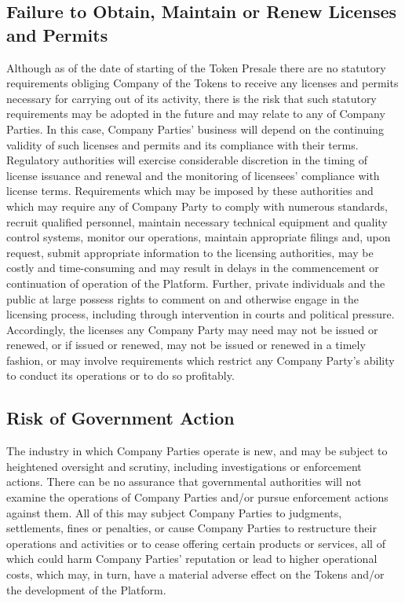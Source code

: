 \documentclass[12pt]{report}
\begin{document}
\subsection*{Failure to Obtain, Maintain or Renew Licenses and Permits}
Although as of the date of starting of the Token Presale there are no statutory requirements obliging Company of the Tokens to receive any licenses and permits necessary for carrying out of its activity, there is the risk that such statutory requirements may be adopted in the future and may relate to any of Company Parties. In this case, Company Parties’ business will depend on the continuing validity of such licenses and permits and its compliance with their terms. Regulatory authorities will exercise considerable discretion in the timing of license issuance and
renewal and the monitoring of licensees’ compliance with license terms. Requirements which may be imposed by these authorities and which may require any of Company Party to comply with numerous standards, recruit qualified personnel, maintain necessary technical equipment and quality control systems, monitor our operations, maintain appropriate filings and, upon request, submit appropriate information to the licensing authorities, may be costly and time-consuming and may result in delays in the commencement or continuation of operation of the
Platform. Further, private individuals and the public at large possess rights to comment on and otherwise engage in the licensing process, including through intervention in courts and political pressure. Accordingly, the licenses any
Company Party may need may not be issued or renewed, or if issued or renewed, may not be issued or renewed in a timely fashion, or may involve requirements which restrict any Company Party’s ability to conduct its operations or to do so profitably.

\subsection*{Risk of Government Action}
The industry in which Company Parties operate is new, and may be subject to heightened oversight and scrutiny, including investigations or enforcement actions. There can be no assurance that governmental authorities will not examine the operations of Company Parties and/or pursue enforcement actions against them. All of this may subject Company Parties to judgments, settlements, fines or penalties, or cause Company Parties to restructure their operations and activities or to cease offering certain products or services, all of which could harm Company Parties’ reputation or lead to higher operational costs, which may, in turn, have a material adverse effect on the Tokens and/or the development of the Platform.
\end{document}
